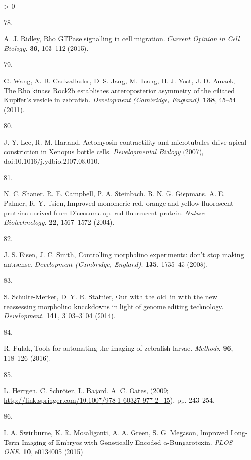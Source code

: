 \documentclass[10pt, b5paper, singlespacinge, twoside]{reedthesis} %
\newlength{\cslhangindent}
\newlength{\csllabelwidth}
\newenvironment{CSLReferences}[3] %
  {%
    \setlength{\parindent}{0pt}
    \ifodd #1 \everypar{\setlength{\hangindent}{\cslhangindent}}\ignorespaces\fi
    \ifnum #2 > 0
    \setlength{\parskip}{#2\baselineskip}
    \fi
  }%
  {}
\newcommand{\CSLLeftMargin}[1]{\parbox[t]{\maxof{\widthof{#1}}{\csllabelwidth}}{#1}}
\newcommand{\CSLRightInline}[1]{\parbox[t]{\linewidth}{#1}}
\theoremstyle{definition}
\theoremstyle{definition}
\theoremstyle{definition}
\theoremstyle{remark}
\begin{document}
\begin{CSLReferences}{0}{0}
\leavevmode\hypertarget{ref-Ridley2015}{}%
\CSLLeftMargin{78. }
\CSLRightInline{A. J. Ridley, {Rho GTPase signalling in cell migration}. \emph{Current Opinion in Cell Biology}. \textbf{36}, 103--112 (2015).}

\leavevmode\hypertarget{ref-Wang2011}{}%
\CSLLeftMargin{79. }
\CSLRightInline{G. Wang, A. B. Cadwallader, D. S. Jang, M. Tsang, H. J. Yost, J. D. Amack, {The Rho kinase Rock2b establishes anteroposterior asymmetry of the ciliated Kupffer's vesicle in zebrafish.} \emph{Development (Cambridge, England)}. \textbf{138}, 45--54 (2011).}

\leavevmode\hypertarget{ref-Lee2007a}{}%
\CSLLeftMargin{80. }
\CSLRightInline{J. Y. Lee, R. M. Harland, {Actomyosin contractility and microtubules drive apical constriction in Xenopus bottle cells}. \emph{Developmental Biology} (2007), doi:\href{https://doi.org/10.1016/j.ydbio.2007.08.010}{10.1016/j.ydbio.2007.08.010}.}

\leavevmode\hypertarget{ref-Shaner2004}{}%
\CSLLeftMargin{81. }
\CSLRightInline{N. C. Shaner, R. E. Campbell, P. A. Steinbach, B. N. G. Giepmans, A. E. Palmer, R. Y. Tsien, {Improved monomeric red, orange and yellow fluorescent proteins derived from Discosoma sp. red fluorescent protein}. \emph{Nature Biotechnology}. \textbf{22}, 1567--1572 (2004).}

\leavevmode\hypertarget{ref-Eisen2008b}{}%
\CSLLeftMargin{82. }
\CSLRightInline{J. S. Eisen, J. C. Smith, {Controlling morpholino experiments: don't stop making antisense.} \emph{Development (Cambridge, England)}. \textbf{135}, 1735--43 (2008).}

\leavevmode\hypertarget{ref-Schulte-Merker2014c}{}%
\CSLLeftMargin{83. }
\CSLRightInline{S. Schulte-Merker, D. Y. R. Stainier, {Out with the old, in with the new: reassessing morpholino knockdowns in light of genome editing technology}. \emph{Development}. \textbf{141}, 3103--3104 (2014).}

\leavevmode\hypertarget{ref-Pulak2016}{}%
\CSLLeftMargin{84. }
\CSLRightInline{R. Pulak, {Tools for automating the imaging of zebrafish larvae}. \emph{Methods}. \textbf{96}, 118--126 (2016).}

\leavevmode\hypertarget{ref-Herrgen2009}{}%
\CSLLeftMargin{85. }
\CSLRightInline{L. Herrgen, C. Schröter, L. Bajard, A. C. Oates, (2009; \url{http://link.springer.com/10.1007/978-1-60327-977-2_15}), pp. 243--254.}

\leavevmode\hypertarget{ref-A.2015}{}%
\CSLLeftMargin{86. }
\CSLRightInline{I. A. Swinburne, K. R. Mosaliganti, A. A. Green, S. G. Megason, {Improved Long-Term Imaging of Embryos with Genetically Encoded \(\alpha\)-Bungarotoxin}. \emph{PLOS ONE}. \textbf{10}, e0134005 (2015).}


\end{CSLReferences}
\end{document}
